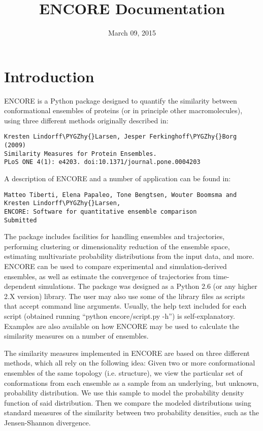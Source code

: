 \documentclass[letterpaper,10pt,english]{sphinxmanual}
\title{ENCORE Documentation}
\date{March 09, 2015}
\author{}
\def\PYGZhy{\char`\-}
\begin{document}
\maketitle
\tableofcontents
{}\label{index::doc}



\chapter{Introduction}
\label{index:introduction}\label{index:welcome-to-encore-s-documentation}
ENCORE is a Python package designed to quantify the similarity between
conformational ensembles of proteins (or in principle other
macromolecules), using three different methods originally described
in:

\begin{Verbatim}[frame=single,commandchars=\\\{\}]
Kresten Lindorff\PYGZhy{}Larsen, Jesper Ferkinghoff\PYGZhy{}Borg (2009)
Similarity Measures for Protein Ensembles.
PLoS ONE 4(1): e4203. doi:10.1371/journal.pone.0004203
\end{Verbatim}

A description of ENCORE and a number of application can be found in:

\begin{Verbatim}[frame=single,commandchars=\\\{\}]
Matteo Tiberti, Elena Papaleo, Tone Bengtsen, Wouter Boomsma and
Kresten Lindorff\PYGZhy{}Larsen,
ENCORE: Software for quantitative ensemble comparison
Submitted
\end{Verbatim}

The package includes facilities for handling ensembles and
trajectories, performing clustering or dimensionality reduction of the
ensemble space, estimating multivariate probability distributions from
the input data, and more. ENCORE can be used to compare experimental
and simulation-derived ensembles, as well as estimate the convergence
of trajectories from time-dependent simulations. The package was
designed as a Python 2.6 (or any higher 2.X version) library. The user
may also use some of the library files as scripts that accept command
line arguments. Usually, the help text included for each script
(obtained running “python encore/script.py -h”) is
self-explanatory. Examples are also available on how ENCORE may be
used to calculate the similarity measures on a number of ensembles.

The similarity measures implemented in ENCORE are based on three
different methods, which all rely on the following idea: Given two or
more conformational ensembles of the same topology (i.e. structure),
we view the particular set of conformations from each ensemble as a
sample from an underlying, but unknown, probability distribution. We
use this sample to model the probability density function of said
distribution. Then we compare the modeled distributions using standard
measures of the similarity between two probability densities, such as
the Jensen-Shannon divergence.
\end{document}
